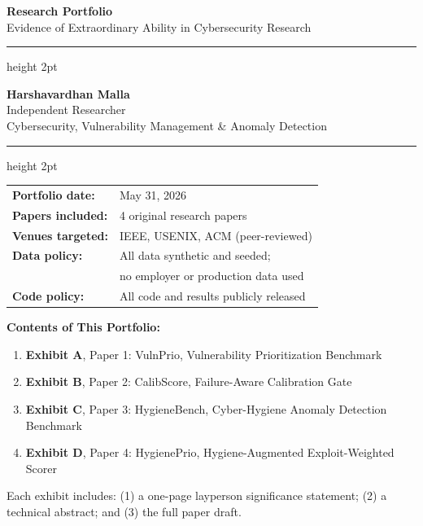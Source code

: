 \documentclass[12pt,letterpaper]{article}
\newenvironment{exhibitbox}{%
  \begin{mdframed}[backgroundcolor=lightblue,linecolor=headblue,linewidth=1.5pt,
                   topline=true,bottomline=true,leftline=true,rightline=true,
                   innertopmargin=12pt,innerbottommargin=12pt,
                   innerleftmargin=14pt,innerrightmargin=14pt]
}{%
  \end{mdframed}
}
\begin{document}
\begin{titlepage}
  \centering
  \vspace*{2cm}

  {\Huge\bfseries\textcolor{headblue}{Research Portfolio}}\\[0.5em]
  {\Large Evidence of Extraordinary Ability in Cybersecurity Research}\\[2em]

  \hrule height 2pt
  \vspace{1em}

  {\LARGE\bfseries Harshavardhan Malla}\\[0.5em]
  {\large Independent Researcher}\\[0.5em]
  {\large Cybersecurity, Vulnerability Management \& Anomaly Detection}\\[2em]

  \hrule height 2pt
  \vspace{2em}

  \begin{tabular}{ll}
    \textbf{Portfolio date:}   & May 31, 2026 \\[0.3em]
    \textbf{Papers included:}  & 4 original research papers \\[0.3em]
    \textbf{Venues targeted:}  & IEEE, USENIX, ACM (peer-reviewed) \\[0.3em]
    \textbf{Data policy:}      & All data synthetic and seeded; \\
                                & no employer or production data used \\[0.3em]
    \textbf{Code policy:}      & All code and results publicly released \\
  \end{tabular}

  \vspace{3em}

  \begin{exhibitbox}
    \textbf{Contents of This Portfolio:}
    \begin{enumerate}[leftmargin=*]
      \item \textbf{Exhibit A}, Paper 1: VulnPrio, Vulnerability Prioritization Benchmark
      \item \textbf{Exhibit B}, Paper 2: CalibScore, Failure-Aware Calibration Gate
      \item \textbf{Exhibit C}, Paper 3: HygieneBench, Cyber-Hygiene Anomaly Detection Benchmark
      \item \textbf{Exhibit D}, Paper 4: HygienePrio, Hygiene-Augmented Exploit-Weighted Scorer
    \end{enumerate}

    \vspace{0.5em}
    Each exhibit includes: (1) a one-page layperson significance statement;
    (2) a technical abstract; and (3) the full paper draft.
  \end{exhibitbox}

\end{titlepage}
\end{document}
